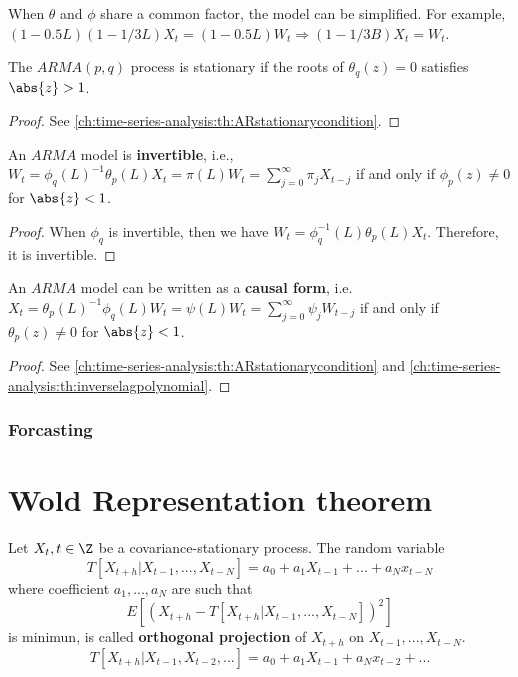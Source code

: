 \begin{remark}
When $\theta$ and $\phi$ share a common factor, the model can be simplified. For example, $(1-0.5L)(1-1/3L)X_t = (1-0.5L)W_t \Rightarrow (1-1/3B)X_t = W_t$.
\end{remark}

\begin{lemma}\cite[95]{shumway2010time}
The $ARMA(p,q)$ process is stationary if the roots of $\theta_q(z) = 0$ satisfies $\abs{z}>1$.
\end{lemma}
\begin{proof}
See \autoref{ch:time-series-analysis:th:ARstationarycondition}.
\end{proof}

\begin{lemma}\cite[95]{shumway2010time}
An $ARMA$ model is \textbf{invertible}, i.e.,
$W_t = \phi_q(L)^{-1}\theta_p(L)X_t =  \pi(L)W_t = \sum_{j=0}^\infty \pi_j X_{t-j}$
if and only if $\phi_p(z)\neq 0$ for $\abs{z}<1$.
\end{lemma}
\begin{proof}
When $\phi_q$ is invertible, then we have $W_t = \phi_q^{-1}(L)\theta_p(L)X_t$. Therefore, it is invertible.
\end{proof}

\begin{lemma}\cite[95]{shumway2010time}
An $ARMA$ model can be written as a \textbf{causal form}, i.e.
$X_t = \theta_p(L)^{-1}\phi_q(L)W_t = \psi(L)W_t = \sum_{j=0}^\infty \psi_j W_{t-j}$
if and only if $\theta_p(z)\neq 0$ for $\abs{z}<1$.
\end{lemma}
\begin{proof}
See \autoref{ch:time-series-analysis:th:ARstationarycondition} and \autoref{ch:time-series-analysis:th:inverselagpolynomial}.
\end{proof}


\subsubsection{Forcasting}




\section{Wold Representation theorem}
\begin{definition}
Let $X_t,t\in \Z$ be a covariance-stationary process. The random variable
$$T[X_{t+h}|X_{t-1},...,X_{t-N}] = a_0 + a_1X_{t-1} + ... + a_Nx_{t-N}$$
where coefficient $a_1,...,a_N$ are such that 
$$E[(X_{t+h} - T[X_{t+h}|X_{t-1},...,X_{t-N}])^2]$$ is minimun, is called \textbf{orthogonal projection} of $X_{t+h}$ on $X_{t-1},...,X_{t-N}$.
$$T[X_{t+h}|X_{t-1},X_{t-2},...] = a_0 + a_1X_{t-1} + a_Nx_{t-2} + ...$$
\end{definition}


